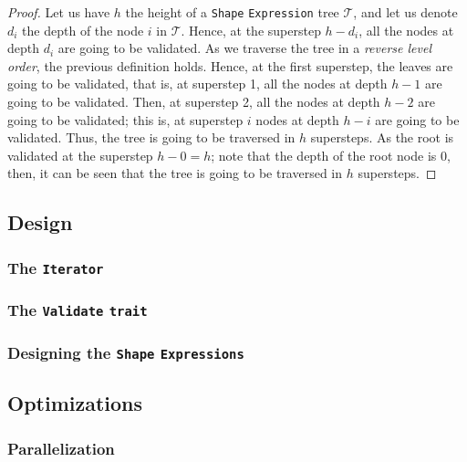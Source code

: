 \begin{proof}
    Let us have $h$ the height of a \texttt{Shape} \texttt{Expression} tree $\mathcal{T}$, and let us denote $d_i$ the depth of the node $i$ in $\mathcal{T}$. Hence, at the superstep $h - d_i$, all the nodes at depth $d_i$ are going to be validated. As we traverse the tree in a \textit{reverse level order}, the previous definition holds. Hence, at the first superstep, the leaves are going to be validated, that is, at superstep 1, all the nodes at depth $h - 1$ are going to be validated. Then, at superstep 2, all the nodes at depth $h - 2$ are going to be validated; this is, at superstep $i$ nodes at depth $h - i$ are going to be validated. Thus, the tree is going to be traversed in $h$ supersteps. As the root is validated at the superstep $h - 0 = h$; note that the depth of the root node is 0, then, it can be seen that the tree is going to be traversed in $h$ supersteps.
\end{proof}

\subsection{Design}

\subsubsection{The \texttt{Iterator}}

\subsubsection{The \texttt{Validate} \texttt{trait}}

\subsubsection{Designing the \texttt{Shape} \texttt{Expressions}}

\subsection{Optimizations}

\subsubsection{Parallelization}

